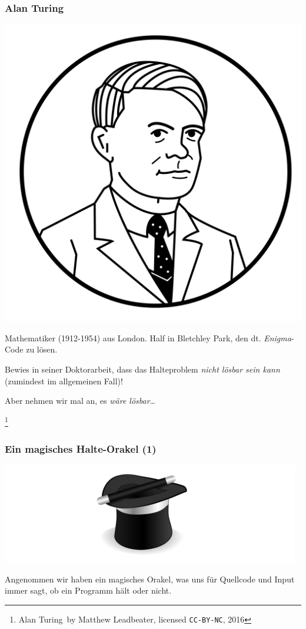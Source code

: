 \documentclass[aspectratio=43]{beamer}
\newcommand\blfootnote[1]{%
  \begingroup
  \renewcommand\thefootnote{}\footnote{#1}%
  \addtocounter{footnote}{-1}%
  \endgroup
}
\begin{document}
\begin{frame}
\frametitle{Alan Turing}

\begin{multicols}{2}

\includegraphics[scale=0.3]{images/turing-circle.png} 

\columnbreak

Mathematiker (1912-1954) aus London. Half in Bletchley Park, den dt. \emph{Enigma}-Code zu lösen.
\bigskip

Bewies in seiner Doktorarbeit, dass das Halteproblem \emph{nicht lösbar sein kann} (zumindest im allgemeinen Fall)!
\pause\bigskip

Aber nehmen wir mal an, es \emph{wäre lösbar}\dots

\end{multicols}

\blfootnote{\glqq Alan Turing\grqq\ by Matthew Leadbeater, licensed \texttt{CC-BY-NC}, 2016}
\end{frame}


\begin{frame}
\frametitle{Ein magisches Halte-Orakel (1)}
\begin{center}
\includegraphics[scale=1.4]{images/hat_alone.png}
\bigskip

Angenommen wir haben ein magisches Orakel, was uns für Quellcode und Input immer sagt, ob ein Programm hält oder nicht.
\end{center}
\end{frame}
\end{document}
